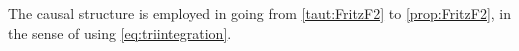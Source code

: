 The causal structure is employed in going from \cref{taut:FritzF2} to \cref{prop:FritzF2}, in the sense of using \cref{eq:triintegration}.





